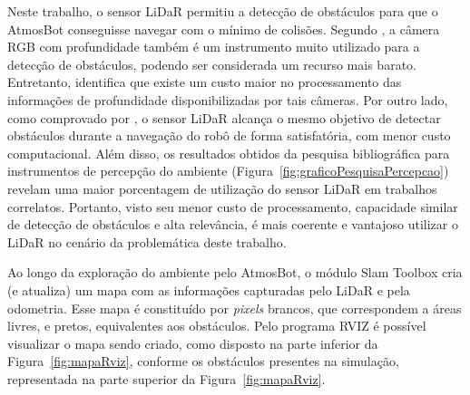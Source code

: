 Neste trabalho, o sensor LiDaR permitiu a detecção de obstáculos para que o AtmosBot conseguisse navegar com o mínimo de colisões. Segundo \citet{dpoom}, a câmera RGB com profundidade também é um instrumento muito utilizado para a detecção de obstáculos, podendo ser considerada um recurso mais barato. Entretanto, \citet{navegacaoSlam:2022} identifica que existe um custo maior no processamento das informações de profundidade disponibilizadas por tais câmeras. Por outro lado, como comprovado por \citet{navegacaoSlam:2022}, o sensor LiDaR  alcança o mesmo objetivo de detectar obstáculos durante a navegação do robô de forma satisfatória, com menor custo computacional. Além disso, os resultados obtidos da pesquisa bibliográfica para instrumentos de percepção do ambiente (Figura~\ref{fig:graficoPesquisaPercepcao}) revelam uma maior porcentagem de utilização do sensor LiDaR em trabalhos correlatos. Portanto, visto seu menor custo de processamento, capacidade similar de detecção de obstáculos e alta relevância, é mais coerente e vantajoso utilizar o LiDaR no cenário da problemática deste trabalho. 

Ao longo da exploração do ambiente pelo AtmosBot, o módulo Slam Toolbox cria (e atualiza) um mapa com as informações capturadas pelo LiDaR e pela odometria. Esse mapa é constituído por \textit{pixels} brancos, que correspondem a áreas livres, e pretos, equivalentes aos obstáculos. Pelo programa RVIZ é possível visualizar o mapa sendo criado, como disposto na parte inferior da Figura~\ref{fig:mapaRviz}, conforme os obstáculos presentes na simulação, representada na parte superior da Figura~\ref{fig:mapaRviz}.

